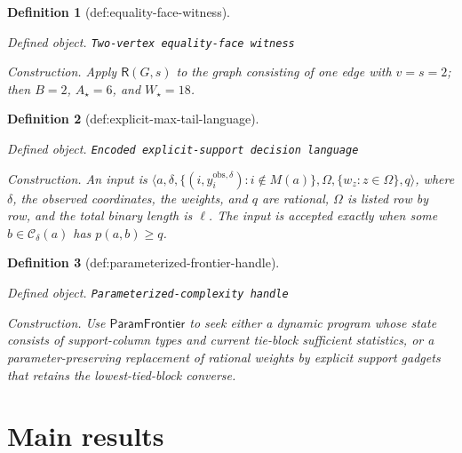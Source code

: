 \documentclass{article}
\newtheorem{definition}{Definition}
\begin{document}
\begin{definition}[def:equality-face-witness]\label{def:equality-face-witness}
\par\smallskip\noindent\emph{Defined object.} \texttt{Two-\allowbreak{}vertex equality-\allowbreak{}face witness}
\par\smallskip\noindent\emph{Construction.} Apply \(\mathsf R(G,s)\) to the graph consisting of one edge with \(v=s=2\); then \(B=2\), \(A_\star=6\), and \(W_\star=18\).
\end{definition}

\begin{definition}[def:explicit-max-tail-language]\label{def:explicit-max-tail-language}
\par\smallskip\noindent\emph{Defined object.} \texttt{Encoded explicit-\allowbreak{}support decision language}
\par\smallskip\noindent\emph{Construction.} An input is \(\langle a,\delta,\{(i,y_i^{\mathrm{obs},\delta}):i\notin M(a)\},\Omega,\{w_z:z\in\Omega\},q\rangle\), where \(\delta\), the observed coordinates, the weights, and \(q\) are rational, \(\Omega\) is listed row by row, and the total binary length is \(\ell\). The input is accepted exactly when some \(b\in\mathcal C_\delta(a)\) has \(p(a,b)\ge q\).
\end{definition}

\begin{definition}[def:parameterized-frontier-handle]\label{def:parameterized-frontier-handle}
\par\smallskip\noindent\emph{Defined object.} \texttt{Parameterized-\allowbreak{}complexity handle}
\par\smallskip\noindent\emph{Construction.} Use \(\mathsf{ParamFrontier}\) to seek either a dynamic program whose state consists of support-column types and current tie-block sufficient statistics, or a parameter-preserving replacement of rational weights by explicit support gadgets that retains the lowest-tied-block converse.
\end{definition}

\section{Main results}
\end{document}

